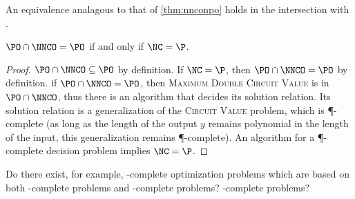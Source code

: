 \documentclass[]{article}
\newcommand{\APr}{\leq_{AP}^{L}}
\begin{document}
An equivalence analagous to that of \autoref{thm:nnconpo} holds in the intersection with \PO.

\begin{theorem}\label{thm:poppo}
  $\PO \cap \NNCO = \PO$ if and only if $\NC = \P$.
\end{theorem}
\begin{proof}
  $\PO \cap \NNCO \subseteq \PO$ by definition.
  If $\NC = \P$, then $\PO \cap \NNCO = \PO$ by definition.
  if $\PO \cap \NNCO = \PO$, then \textsc{Maximum Double Circuit Value} is in $\PO \cap \NNCO$, thus there is an \NC{} algorithm that decides its solution relation.
  Its solution relation is a generalization of the \textsc{Circuit Value} problem, which is \P-complete (as long as the length of the output $y$ remains polynomial in the length of the input, this generalization remains \P-complete).
  An \NC{} algorithm for a \P-complete decision problem implies $\NC = \P$.
\end{proof}



\begin{todo}
  Do there exist, for example, \ApxPO-complete optimization problems which are based on both \NP-complete problems and \PSPACE-complete problems?
  \STP-complete problems?
\end{todo}
\end{document}
